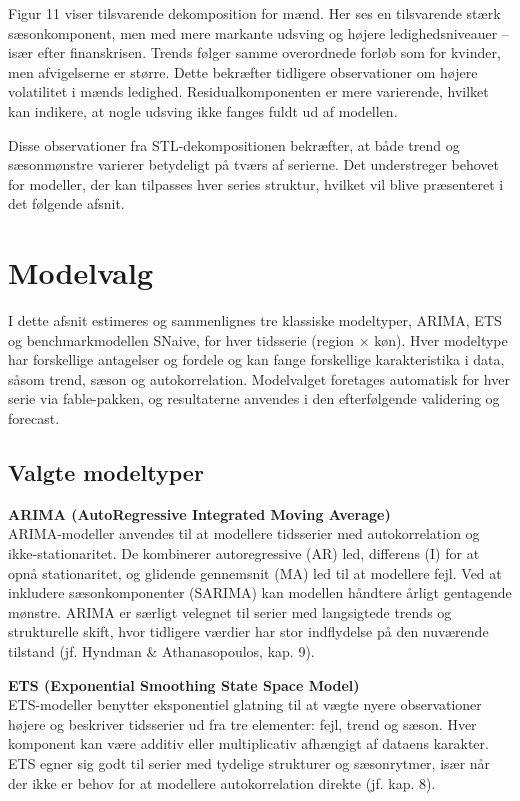 \documentclass[
]{article}
\begin{document}
Figur 11 viser tilsvarende dekomposition for mænd. Her ses en
tilsvarende stærk sæsonkomponent, men med mere markante udsving og
højere ledighedsniveauer -- især efter finanskrisen. Trends følger samme
overordnede forløb som for kvinder, men afvigelserne er større. Dette
bekræfter tidligere observationer om højere volatilitet i mænds
ledighed. Residualkomponenten er mere varierende, hvilket kan indikere,
at nogle udsving ikke fanges fuldt ud af modellen.

Disse observationer fra STL-dekompositionen bekræfter, at både trend og
sæsonmønstre varierer betydeligt på tværs af serierne. Det understreger
behovet for modeller, der kan tilpasses hver series struktur, hvilket
vil blive præsenteret i det følgende afsnit.

\section{Modelvalg}\label{modelvalg}

I dette afsnit estimeres og sammenlignes tre klassiske modeltyper,
ARIMA, ETS og benchmarkmodellen SNaive, for hver tidsserie (region ×
køn). Hver modeltype har forskellige antagelser og fordele og kan fange
forskellige karakteristika i data, såsom trend, sæson og
autokorrelation. Modelvalget foretages automatisk for hver serie via
fable-pakken, og resultaterne anvendes i den efterfølgende validering og
forecast.

\subsection{Valgte modeltyper}\label{valgte-modeltyper}

\textbf{ARIMA (AutoRegressive Integrated Moving Average)}\\
ARIMA-modeller anvendes til at modellere tidsserier med autokorrelation
og ikke-stationaritet. De kombinerer autoregressive (AR) led, differens
(I) for at opnå stationaritet, og glidende gennemsnit (MA) led til at
modellere fejl. Ved at inkludere sæsonkomponenter (SARIMA) kan modellen
håndtere årligt gentagende mønstre. ARIMA er særligt velegnet til serier
med langsigtede trends og strukturelle skift, hvor tidligere værdier har
stor indflydelse på den nuværende tilstand (jf. Hyndman \&
Athanasopoulos, kap. 9).

\textbf{ETS (Exponential Smoothing State Space Model)}\\
ETS-modeller benytter eksponentiel glatning til at vægte nyere
observationer højere og beskriver tidsserier ud fra tre elementer: fejl,
trend og sæson. Hver komponent kan være additiv eller multiplicativ
afhængigt af dataens karakter. ETS egner sig godt til serier med
tydelige strukturer og sæsonrytmer, især når der ikke er behov for at
modellere autokorrelation direkte (jf. kap. 8).
\end{document}
